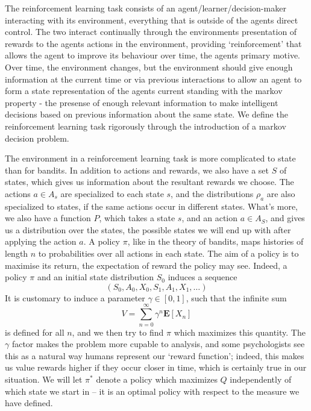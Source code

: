 The reinforcement learning task consists of an agent/learner/decision-maker interacting with its environment, everything that is outside of the agents direct control. The two interact continually through the environments presentation of rewards to the agents actions in the environment, providing `reinforcement' that allows the agent to improve its behaviour over time, the agents primary motive. Over time, the environment changes, but the environment should give enough information at the current time or via previous interactions to allow an agent to form a state representation of the agents current standing with the markov property - the presense of enough relevant information to make intelligent decisions based on previous information about the same state. We define the reinforcement learning task rigorously through the introduction of a markov decision problem.

The environment in a reinforcement learning task is more complicated to state than for bandits. In addition to actions and rewards, we also have a set $S$ of states, which gives us information about the resultant rewards we choose. The actions $a \in A_s$ are specialized to each state $s$, and the distributions $\rho_a$ are also specialized to states, if the same actions occur in different states. What's more, we also have a function $P$, which takes a state $s$, and an action $a \in A_S$, and gives us a distribution over the states, the possible states we will end up with after applying the action $a$. A policy $\pi$, like in the theory of bandits, maps histories of length $n$ to probabilities over all actions in each state. The aim of a policy is to maximise its return, the expectation of reward the policy may see. Indeed, a policy $\pi$ and an initial state distribution $S_0$ induces a sequence
%
\[ (S_0, A_0, X_0, S_1, A_1, X_1, \dots) \]
%
It is customary to induce a parameter $\gamma \in [0,1]$, such that the infinite sum
%
\[ V = \sum_{n = 0}^\infty \gamma^n \mathbf{E}[X_n] \]
%
is defined for all $n$, and we then try to find $\pi$ which maximizes this quantity. The $\gamma$ factor makes the problem more cupable to analysis, and some psychologists see this as a natural way humans represent our `reward function'; indeed, this makes us value rewards higher if they occur closer in time, which is certainly true in our situation. We will let $\pi^*$ denote a policy which maximizes $Q$ independently of which state we start in -- it is an optimal policy with respect to the measure we have defined.

